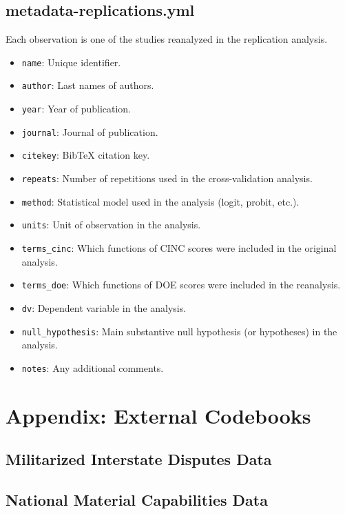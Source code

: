 \documentclass[12pt]{article}
\begin{document}
\subsection{metadata-replications.yml}

Each observation is one of the studies reanalyzed in the replication analysis.

\begin{itemize}
  \item \texttt{name}: Unique identifier.
  \item \texttt{author}: Last names of authors.
  \item \texttt{year}: Year of publication.
  \item \texttt{journal}: Journal of publication.
  \item \texttt{citekey}: BibTeX citation key.
  \item \texttt{repeats}: Number of repetitions used in the cross-validation analysis.
  \item \texttt{method}: Statistical model used in the analysis (logit, probit, etc.).
  \item \texttt{units}: Unit of observation in the analysis.
  \item \texttt{terms\_cinc}: Which functions of CINC scores were included in the original analysis.
  \item \texttt{terms\_doe}: Which functions of DOE scores were included in the reanalysis.
  \item \texttt{dv}: Dependent variable in the analysis.
  \item \texttt{null\_hypothesis}: Main substantive null hypothesis (or hypotheses) in the analysis.
  \item \texttt{notes}: Any additional comments.
\end{itemize}






\appendix
\section{Appendix: External Codebooks}

\subsection{Militarized Interstate Disputes Data}



\subsection{National Material Capabilities Data}


\end{document}
